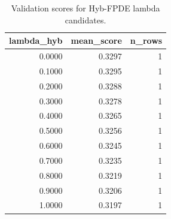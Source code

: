 \begin{table}[t]
\caption{Validation scores for Hyb-FPDE lambda candidates.}
\label{tab:lambda_distribution_computed}
\centering
\begin{tabular}{rrr}
\toprule
lambda\_hyb & mean\_score & n\_rows \\
\midrule
0.0000 & 0.3297 & 1 \\
0.1000 & 0.3295 & 1 \\
0.2000 & 0.3288 & 1 \\
0.3000 & 0.3278 & 1 \\
0.4000 & 0.3265 & 1 \\
0.5000 & 0.3256 & 1 \\
0.6000 & 0.3245 & 1 \\
0.7000 & 0.3235 & 1 \\
0.8000 & 0.3219 & 1 \\
0.9000 & 0.3206 & 1 \\
1.0000 & 0.3197 & 1 \\
\bottomrule
\end{tabular}

\end{table}

